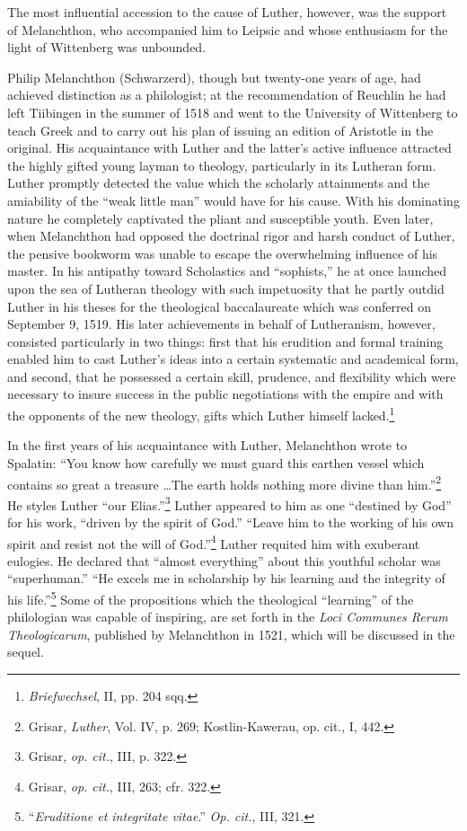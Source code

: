 The most influential accession to the cause of Luther, however, was
the support of Melanchthon, who accompanied him to Leipsic and
whose enthusiasm for the light of Wittenberg was unbounded.

Philip Melanchthon (Schwarzerd), though but twenty-one years
of age, had achieved distinction as a philologist; at the recommendation
of Reuchlin he had left Tiibingen in the summer of 1518 and
went to the University of Wittenberg to teach Greek and to carry
out his plan of issuing an edition of Aristotle in the original. His
acquaintance with Luther and the latter’s active influence attracted
the highly gifted young layman to theology, particularly in its
Lutheran form. Luther promptly detected the value which the
scholarly attainments and the amiability of the “weak little man”
would have for his cause. With his dominating nature he completely
captivated the pliant and susceptible youth. Even later, when Melanchthon
had opposed the doctrinal rigor and harsh conduct of
Luther, the pensive bookworm was unable to escape the overwhelming
influence of his master. In his antipathy toward Scholastics and
“sophists,” he at once launched upon the sea of Lutheran theology
with such impetuosity that he partly outdid Luther in his theses for
the theological baccalaureate which was conferred on September
9, 1519. His later achievements in behalf of Lutheranism, however,
consisted particularly in two things: first that his erudition and
formal training enabled him to cast Luther's ideas into a certain
systematic and academical form, and second, that he possessed a
certain skill, prudence, and flexibility which were necessary to insure
success in the public negotiations with the empire and with the
opponents of the new theology, gifts which Luther himself lacked.\footnote
{\textit{Briefwechsel}, II, pp. 204 sqq.}

In the first years of his acquaintance with Luther, Melanchthon
wrote to Spalatin: ``You know how carefully we must guard this
earthen vessel which contains so great a treasure \dots The earth
holds nothing more divine than him.''\footnote{Grisar, \textit{Luther}, Vol. IV, p. 269; Kostlin-Kawerau, op. cit., I, 442.}
He styles Luther “our Elias.”\footnote{Grisar, \textit{op. cit.}, III, p. 322.}
Luther appeared to him as one “destined by God” for his
work, “driven by the spirit of God.” “Leave him to the working
of his own spirit and resist not the will of God.”\footnote{Grisar, \textit{op. cit.}, III, 263; cfr. 322.}
Luther requited
him with exuberant eulogies. He declared that “almost everything”
about this youthful scholar was “superhuman.” “He excels me in
scholarship by his learning and the integrity of his life.”\footnote
{“\textit{Eruditione et integritate vitae}.” \textit{Op. cit.}, III, 321.}
Some
of the propositions which the theological “learning” of the philologian
was capable of inspiring, are set forth in the \textit{Loci Communes Rerum
Theologicarum}, published by Melanchthon in 1521, which will be
discussed in the sequel.

